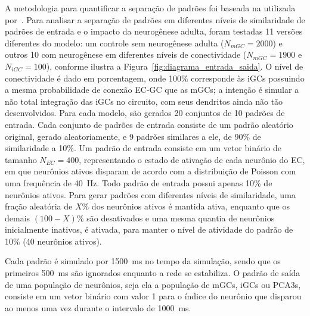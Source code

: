 A metodologia para quantificar a separação de padrões foi baseada na utilizada por~. Para analisar a
separação de padrões em diferentes níveis de similaridade de padrões de entrada e o impacto da neurogênese adulta, foram testadas
11 versões diferentes do modelo: um controle sem neurogênese adulta ($N_{mGC} = 2000$) e outros 10 com neurogênese em diferentes
níveis de conectividade ($N_{mGC} = 1900$ e $N_{iGC} = 100$), conforme ilustra a Figura~\ref{fig:diagrama_entrada_saida}. O nível
de conectividade é dado em porcentagem, onde 100\% corresponde às iGCs possuindo a mesma probabilidade de conexão EC-GC que as
mGCs; a intenção é simular a não total integração das iGCs no circuito, com seus dendritos ainda não tão desenvolvidos. Para cada
modelo, são gerados 20 conjuntos de 10 padrões de entrada. Cada conjunto de padrões de entrada consiste de um padrão aleatório
original, gerado aleatoriamente, e 9 padrões similares a ele, de 90\% de similaridade a 10\%. Um padrão de entrada consiste em um
vetor binário de tamanho $N_{EC} = 400$, representando o estado de ativação de cada neurônio do EC, em que neurônios ativos
disparam de acordo com a distribuição de Poisson com uma frequência de \SI{40}{\hertz}. Todo padrão de entrada possui apenas 10\%
de neurônios ativos. Para gerar padrões com diferentes níveis de similaridade, uma fração aleatória de $X\%$ dos neurônios ativos
é mantida ativa, enquanto que os demais $(100 - X)\%$ são desativados e uma mesma quantia de neurônios inicialmente inativos, é
ativada, para manter o nível de atividade do padrão de 10\% (40 neurônios ativos).

Cada padrão é simulado por \SI{1500}{\milli\second} no tempo da simulação, sendo que os primeiros \SI{500}{\milli\second} são
ignorados enquanto a rede se estabiliza. O padrão de saída de uma população de neurônios, seja ela a população de mGCs, iGCs ou
PCA3s, consiste em um vetor binário com valor 1 para o índice do neurônio que disparou ao menos uma vez durante o intervalo de
\SI{1000}{\milli\second}.

